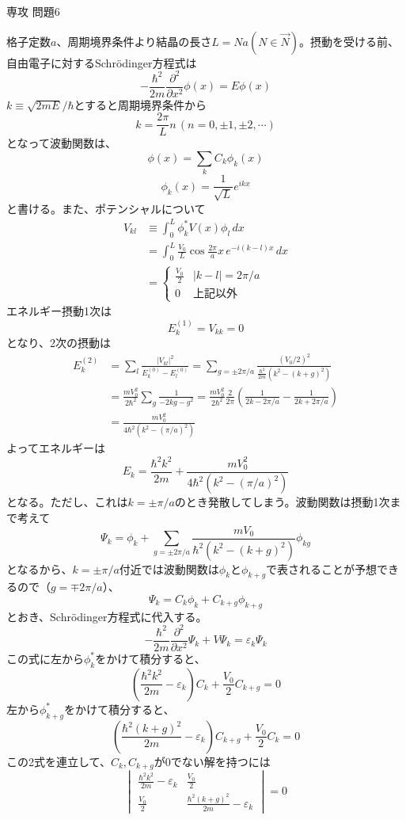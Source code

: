 \documentclass[fleqn]{jbook}
\begin{document}
\begin{answer}{専攻 問題6}
\begin{subanswers}
\SubAnswer
格子定数$a$、周期境界条件より結晶の長さ$L=Na(N\in \Vec{N})$。摂動を受ける前、自由電子に対するSchr\"{o}dinger方程式は
\[-\frac{\hbar^2}{2m}\frac{\partial^2}{\partial x^2}\phi(x)=E\phi(x)\]
$k\equiv \sqrt{2mE}/\hbar$とすると周期境界条件から
\[k=\frac{2\pi}{L}n \,　 (n=0,\pm 1, \pm 2, \cdots)\]
となって波動関数は、
\[\phi(x)=\sum_k C_k \phi _k (x)\]
\[\phi_k(x)=\frac{1}{\sqrt{L}}e^{ikx}\]
と書ける。また、ポテンシャルについて
\begin{align*}
V_{kl} &\equiv \int_0^L \phi _k^* V(x) \phi_l \,dx \\
       &= \int _0^L \frac{V_0}{L}\cos \frac{2\pi}{a}x \,e^{-i(k-l)x}\, dx\\
       &= \begin{cases}
                      \frac{V_0}{2} & |k-l|=2\pi /a \\
                      0             & \text{上記以外}
          \end{cases}               
\end{align*}
エネルギー摂動1次は
\[E_k^{(1)}=V_{kk}=0\]
となり、2次の摂動は
\begin{align*}
E_k^{(2)}
&= \sum_l \frac{|V_{kl}|^2}{E_k^{(0)}-E_l^{(0)}}=\sum_{g=\pm 2\pi/a}\frac{( V_0 /2 )^2}{\frac{\hbar ^2}{2m}(k^2-(k+g)^2)}\\
&= \frac{mV_0^2}{2\hbar^2}\sum_g \frac{1}{-2kg-g^2}=\frac{mV_0^2}{2\hbar^2}\frac{2}{2\pi}\left( \frac{1}{2k-2\pi/a}- \frac{1}{2k+2\pi/a} \right)\\
&= \frac{mV_0^2}{4\hbar^2 (k^2 - (\pi /a)^2)}
\end{align*}
よってエネルギーは
\[E_k=\frac{\hbar^2 k^2}{2m}+\frac{mV_0^2}{4\hbar^2(k^2-(\pi/a)^2)}\]
となる。ただし、これは$k=\pm \pi /a$のとき発散してしまう。波動関数は摂動1次まで考えて
\[\Psi_k=\phi _k +\sum_{g=\pm 2\pi/a}\frac{mV_0}{\hbar^2(k^2-(k+g)^2)}\phi_{kg}\]
となるから、$k=\pm \pi /a$付近では波動関数は$\phi_k$と$\phi_{k+g}$で表されることが予想できるので（$g=\mp 2\pi/a$）、
\[\Psi_k=C_k \phi_k + C_{k+g} \phi_{k+g}\]
とおき、Schr\"{o}dinger方程式に代入する。
\[-\frac{\hbar^2}{2m}\frac{\partial^2}{\partial x^2}\Psi _k +V\Psi_k =\varepsilon _k \Psi _k\]
この式に左から$\phi_k^* $をかけて積分すると、
\[\left( \frac{\hbar^2k^2}{2m} - \varepsilon _k\right) C_k+\frac{V_0}{2}C_{k+g}=0\]
左から$\phi_{k+g}^* $をかけて積分すると、
\[\left( \frac{\hbar^2(k+g)^2}{2m} - \varepsilon _k\right) C_{k+g}+\frac{V_0}{2}C_{k}=0\]
この2式を連立して、$C_k,C_{k+g}$が0でない解を持つには
\[
\begin{vmatrix}
\frac{\hbar^2k^2}{2m}-\varepsilon _k & \frac{V_0}{2}\\
\frac{V_0}{2}                        & \frac{\hbar^2(k+g)^2}{2m}-\varepsilon _k
\end{vmatrix}
=0
\]


\end{subanswers}
\end{answer}
\end{document}
